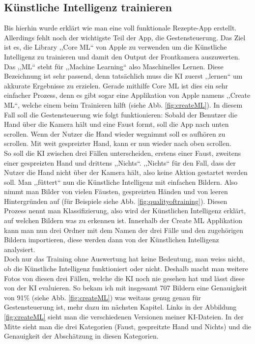 \documentclass[12pt]{article}
\begin{document}
\subsection{Künstliche Intelligenz trainieren}
Bis hierhin wurde erklärt wie man eine voll funktionale Rezepte-App erstellt. Allerdings fehlt noch der wichtigste Teil der App, die Gestensteuerung. Das Ziel ist es, die Library ,,Core ML`` von Apple zu verwenden um die Künstliche Intelligenz zu trainieren und damit den Output der Frontkamera auszuwerten. Das ,,ML`` steht für ,,Machine Learning`` also Maschinelles Lernen. Diese Bezeichnung ist sehr passend, denn tatsächlich muss die KI zuerst ,,lernen`` um akkurate Ergebnisse zu erzielen. Gerade mithilfe Core ML ist dies ein sehr einfacher Prozess, denn es gibt sogar eine Applikation von Apple namens ,,Create ML``, welche einem beim Trainieren hilft (siehe Abb. \ref{fig:createML}). In diesem Fall soll die Gestensteuerung wie folgt funktionieren: Sobald der Benutzer die Hand über die Kamera hält und eine Faust formt, soll die App nach unten scrollen. Wenn der Nutzer die Hand wieder wegnimmt soll es aufhören zu scrollen. Mit weit gespreizter Hand, kann er nun wieder nach oben scrollen. \\ So soll die KI zwischen drei Fällen unterscheiden, erstens einer Faust, zweitens einer gespreizten Hand und drittens ,,Nichts``. ,,Nichts`` für den  Fall, dass der Nutzer die Hand nicht über der Kamera hält, also keine Aktion gestartet werden soll. Man ,,füttert`` nun die Künstliche Intelligenz mit einfachen Bildern. Also nimmt man Bilder von vielen Fäusten, gespreizten Händen und von leeren Hintergründen auf (für Beispiele siehe Abb. \ref{fig:qualityoftraining}). Diesen Prozess nennt man Klassifizierung, also wird der Künstlichen Intelligenz erklärt, auf welchen Bildern was zu erkennen ist. Innerhalb der Create ML Applikation kann man nun drei Ordner mit dem Namen der drei Fälle und den zugehörigen Bildern importieren, diese werden dann von der Künstlichen Intelligenz analysiert. \\ Doch nur das Training ohne Auswertung hat keine Bedeutung, man weiss nicht, ob die Künstliche Intelligenz funktioniert oder nicht. Deshalb macht man weitere Fotos von diesen drei Fällen, welche die KI noch nie gesehen hat und lässt diese von der KI evaluieren. So bekam ich mit insgesamt 707 Bildern eine Genauigkeit von 91\% (siehe Abb. \ref{fig:createML}) was weitaus genug genau für Gestensteuerung ist, mehr dazu im nächsten Kapitel. Links in der Abbildung \ref{fig:createML} sieht man die verschiedenen Versionen meiner KI-Dateien. In der Mitte sieht man die drei Kategorien (Faust, gespreitzte Hand und Nichts) und die Genauigkeit der Abschätzung in diesen Kategorien. \cite{gesturecontrolvideo}\\
\end{document}
